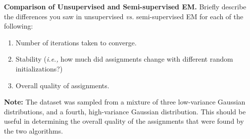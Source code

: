 \ifnum{} {
  \clearpage
} \fi
\item{}
\textbf{Comparison of Unsupervised and Semi-supervised EM.}
Briefly describe the differences you saw in unsupervised \emph{vs.} semi-supervised EM for each of the following:
\begin{enumerate}[label=\roman*.]
    \item Number of iterations taken to converge.
    \item Stability (\emph{i.e.,} how much did assignments change with different random initializations?)
    \item Overall quality of assignments.
\end{enumerate}

\textbf{Note:} The dataset was sampled from a mixture of three low-variance Gaussian distributions, and a fourth, high-variance Gaussian distribution. This should be useful in determining the overall quality of the assignments that were found by the two algorithms.


\ifnum{} {
  
} \fi
